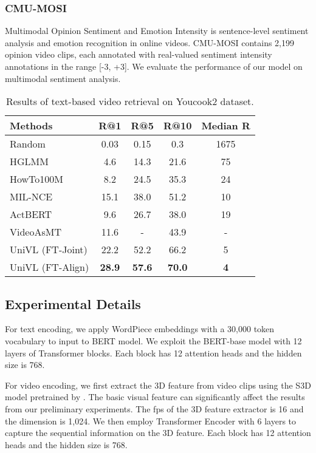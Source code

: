 \documentclass[11pt,a4paper]{article}
\begin{document}
	\subsubsection{CMU-MOSI} Multimodal Opinion Sentiment and Emotion Intensity \cite{zadeh2016multimodal} is sentence-level sentiment analysis and emotion recognition in online videos. CMU-MOSI contains 2,199 opinion video clips, each annotated with real-valued sentiment intensity annotations in the range [-3, +3]. We evaluate the performance of our model on multimodal sentiment analysis.
	\begin{table*}[ht]
		\setlength{\tabcolsep}{4pt}
		\centering
\begin{tabular}{lcccc}
			\toprule
			Methods  & R@1   & R@5 & R@10 & Median R  \\ \midrule
			Random   & 0.03	& 0.15	& 0.3 & 1675 \\  
			HGLMM \cite{klein2015associating} & 4.6 & 14.3 & 21.6 & 75 \\  
			HowTo100M \cite{miech2019howto100m}   & 8.2 & 24.5 & 35.3 & 24 \\ 
			MIL-NCE \cite{miech19endtoend} & 15.1 & 38.0 & 51.2 & 10 \\ 
			ActBERT \cite{Zhu_2020_CVPR}    & 9.6 & 26.7 & 38.0 & 19 \\ 
			VideoAsMT \cite{Korbar2020}   & 11.6 & - & 43.9 & - \\ 
			\midrule 
			UniVL (FT-Joint)    & 22.2 & 52.2 & 66.2 & 5 \\
			UniVL (FT-Align)    & \textbf{28.9} & \textbf{57.6} & \textbf{70.0} & \textbf{4} \\
			\bottomrule
		\end{tabular}
\caption{Results of text-based video retrieval on Youcook2 dataset.}
		\label{tab:result_of_retrieval_youcook}
	\end{table*}
	
	\subsection{Experimental Details}
	For text encoding, we apply WordPiece embeddings \cite{wu2016google} with a 30,000 token vocabulary to input to BERT model. We exploit the BERT-base model \cite{devlin2019bert} with 12 layers of Transformer blocks. Each block has 12 attention heads and the hidden size is 768.
	
	For video encoding, we first extract the 3D feature from video clips using the S3D model pretrained by \citet{miech19endtoend}. The basic visual feature can significantly affect the results from our preliminary experiments. The fps of the 3D feature extractor is 16 and the dimension is 1,024. We then employ Transformer Encoder with 6 layers to capture the sequential information on the 3D feature. Each block has 12 attention heads and the hidden size is 768.
	
\end{document}

